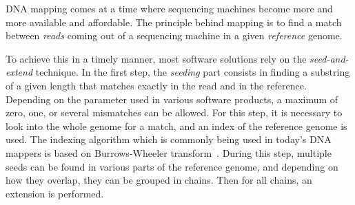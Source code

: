 DNA mapping comes at a time where sequencing machines become more and more available and affordable. The principle behind mapping is to find a match between \emph{reads} coming out of a sequencing machine in a given \emph{reference} genome. 

To achieve this in a timely manner, most software solutions rely on the \emph{seed-and-extend} technique. In the first step, the \emph{seeding} part consists in finding a substring of a given length that matches exactly in the read and in the reference. Depending on the parameter used in various software products, a maximum of zero, one, or several mismatches can be allowed. For this step, it is necessary to look into the whole genome for a match, and an index of the reference genome is used. The indexing algorithm which is commonly being used in today's DNA mappers is based on Burrows-Wheeler transform~\cite{BurrowsWheeler:align}. During this step, multiple seeds can be found in various parts of the reference genome, and depending on how they overlap, they can be grouped in chains. Then for all chains, an extension is performed.


